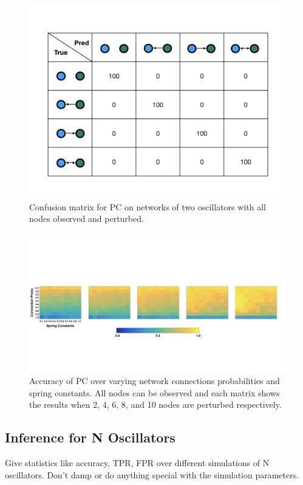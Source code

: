\documentclass[]{article}
\begin{document}
\begin{figure}
    \centering
    \includegraphics[width=12cm]{Pert2ConfusionMatrix.jpeg}
    \caption{Confusion matrix for PC on networks of two oscillators with all nodes observed and perturbed.}
    \label{fig:example}
\end{figure}

\begin{figure}
    \centering
    \includegraphics[width=15cm]{VaryStrengthsProbs.jpeg}
    \caption{Accuracy of PC over varying network connections probabilities and spring constants. All nodes can be observed and each matrix shows the results when 2, 4, 6, 8, and 10 nodes are perturbed respectively.}
    \label{fig:example}
\end{figure}

\subsection{Inference for N Oscillators}
Give statistics like accuracy, TPR, FPR over different simulations of N oscillators. Don't damp or do anything special with the simulation parameters.
\end{document}
